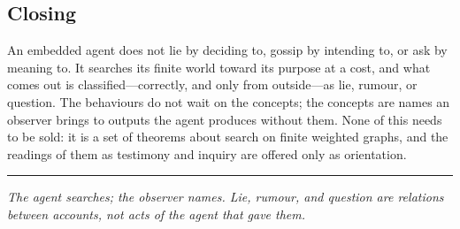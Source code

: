 \documentclass[11pt,twocolumn,a4paper]{article}
\begin{document}
\subsection{Closing}

An embedded agent does not lie by deciding to, gossip by intending to, or ask
by meaning to. It searches its finite world toward its purpose at a cost, and
what comes out is classified---correctly, and only from outside---as lie,
rumour, or question. The behaviours do not wait on the concepts; the concepts
are names an observer brings to outputs the agent produces without them. None
of this needs to be sold: it is a set of theorems about search on finite
weighted graphs, and the readings of them as testimony and inquiry are
offered only as orientation.

\vspace{0.6em}
\hrule
\vspace{0.4em}
\noindent\emph{The agent searches; the observer names. Lie, rumour, and
question are relations between accounts, not acts of the agent that gave
them.}



\end{document}
